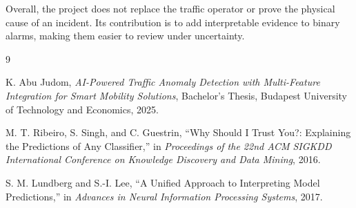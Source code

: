 \documentclass[10pt,a4paper]{article}
\begin{document}
	Overall, the project does not replace the traffic operator or prove the physical cause of an incident. Its contribution is to add interpretable evidence to binary alarms, making them easier to review under uncertainty.
	
	
	\begin{thebibliography}{9}
		
		K. Abu Judom, \textit{AI-Powered Traffic Anomaly Detection with Multi-Feature Integration for Smart Mobility Solutions}, Bachelor's Thesis, Budapest University of Technology and Economics, 2025.
		
		M. T. Ribeiro, S. Singh, and C. Guestrin, ``Why Should I Trust You?: Explaining the Predictions of Any Classifier,'' in \textit{Proceedings of the 22nd ACM SIGKDD International Conference on Knowledge Discovery and Data Mining}, 2016.
		
		S. M. Lundberg and S.-I. Lee, ``A Unified Approach to Interpreting Model Predictions,'' in \textit{Advances in Neural Information Processing Systems}, 2017.
		

		
	\end{thebibliography}
	
\end{document}
